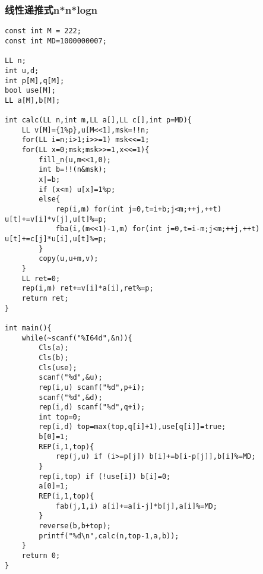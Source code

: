 \subsubsection{线性递推式n*n*logn}
\begin{verbatim}
const int M = 222;
const int MD=1000000007;

LL n;
int u,d;
int p[M],q[M];
bool use[M];
LL a[M],b[M];

int calc(LL n,int m,LL a[],LL c[],int p=MD){
    LL v[M]={1%p},u[M<<1],msk=!!n;
    for(LL i=n;i>1;i>>=1) msk<<=1;
    for(LL x=0;msk;msk>>=1,x<<=1){
        fill_n(u,m<<1,0);
        int b=!!(n&msk);
        x|=b;
        if (x<m) u[x]=1%p;
        else{
            rep(i,m) for(int j=0,t=i+b;j<m;++j,++t) u[t]+=v[i]*v[j],u[t]%=p;
            fba(i,(m<<1)-1,m) for(int j=0,t=i-m;j<m;++j,++t) u[t]+=c[j]*u[i],u[t]%=p;
        }
        copy(u,u+m,v);
    }
    LL ret=0;
    rep(i,m) ret+=v[i]*a[i],ret%=p;
    return ret;
}

int main(){
    while(~scanf("%I64d",&n)){
        Cls(a);
        Cls(b);
        Cls(use);
        scanf("%d",&u);
        rep(i,u) scanf("%d",p+i);
        scanf("%d",&d);
        rep(i,d) scanf("%d",q+i);
        int top=0;
        rep(i,d) top=max(top,q[i]+1),use[q[i]]=true;
        b[0]=1;
        REP(i,1,top){
            rep(j,u) if (i>=p[j]) b[i]+=b[i-p[j]],b[i]%=MD;
        }
        rep(i,top) if (!use[i]) b[i]=0;
        a[0]=1;
        REP(i,1,top){
            fab(j,1,i) a[i]+=a[i-j]*b[j],a[i]%=MD;
        }
        reverse(b,b+top);
        printf("%d\n",calc(n,top-1,a,b));
    }
    return 0;
}
\end{verbatim}
